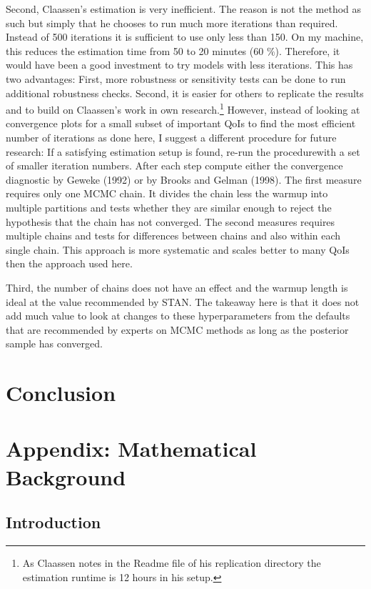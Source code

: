 \documentclass[12pt,english,a4paper,oneside]{article}
\theoremstyle{definition}
\theoremstyle{definition}
\theoremstyle{definition}
\theoremstyle{definition}
\theoremstyle{remark}
\begin{document}
Second, Claassen's estimation is very inefficient. The reason is not the method as such but simply that he chooses to run much more iterations than required. Instead of 500 iterations it is sufficient to use only less than 150. On my machine, this reduces the estimation time from 50 to 20 minutes (60 \(\%\)). Therefore, it would have been a good investment to try models with less iterations. This has two advantages: First, more robustness or sensitivity tests can be done to run additional robustness checks. Second, it is easier for others to replicate the results and to build on Claassen's work in own research.\footnote{As Claassen notes in the Readme file of his replication directory the estimation runtime is 12 hours in his setup.} However, instead of looking at convergence plots for a small subset of important QoIs to find the most efficient number of iterations as done here, I suggest a different procedure for future research: If a satisfying estimation setup is found, re-run the procedurewith a set of smaller iteration numbers. After each step compute either the convergence diagnostic by Geweke (1992) or by Brooks and Gelman (1998). The first measure requires only one MCMC chain. It divides the chain less the warmup into multiple partitions and tests whether they are similar enough to reject the hypothesis that the chain has not converged. The second measures requires multiple chains and tests for differences between chains and also within each single chain. This approach is more systematic and scales better to many QoIs then the approach used here.

Third, the number of chains does not have an effect and the warmup length is ideal at the value recommended by STAN. The takeaway here is that it does not add much value to look at changes to these hyperparameters from the defaults that are recommended by experts on MCMC methods as long as the posterior sample has converged.

\hypertarget{conclusion}{%
\section{Conclusion}\label{conclusion}}

\hypertarget{appendix-mathematical-background}{%
\section{Appendix: Mathematical Background}\label{appendix-mathematical-background}}

\hypertarget{introduction-1}{%
\subsection{Introduction}\label{introduction-1}}
\end{document}
